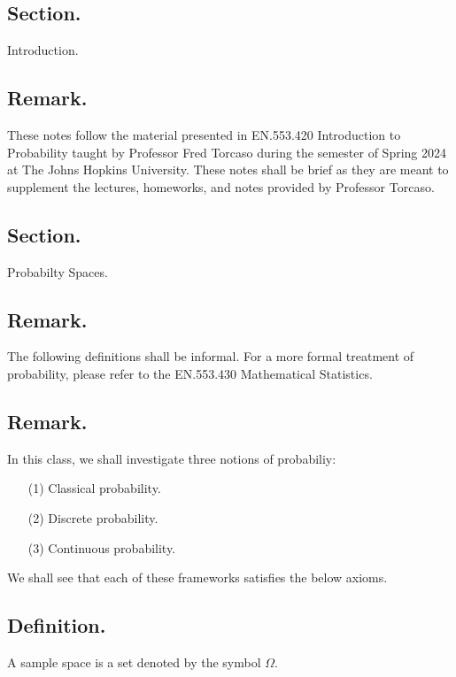 \documentclass[titlepage]{article}
\begin{document}
\newpage \maketitle

\newpage \tableofcontents

\newpage {}

\subsection{Section.} Introduction.

\subsection{Remark.} These notes follow the material presented in EN.553.420 Introduction to Probability taught by Professor Fred Torcaso during the semester of Spring 2024 at The Johns Hopkins University. These notes shall be brief as they are meant to supplement the lectures, homeworks, and notes provided by Professor Torcaso.

\newpage {}

\subsection{Section.} Probabilty Spaces.

\subsection{Remark.} The following definitions shall be informal. For a more formal treatment of probability, please refer to the EN.553.430 Mathematical Statistics.

\subsection{Remark.} In this class, we shall investigate three notions of probabiliy:
\begin{enumerate}
\item[(1)] Classical probability.
\item[(2)] Discrete probability.
\item[(3)] Continuous probability.
\end{enumerate}
We shall see that each of these frameworks satisfies the below axioms.

\subsection{Definition.} A sample space is a set denoted by the symbol $\Omega$.
\end{document}
